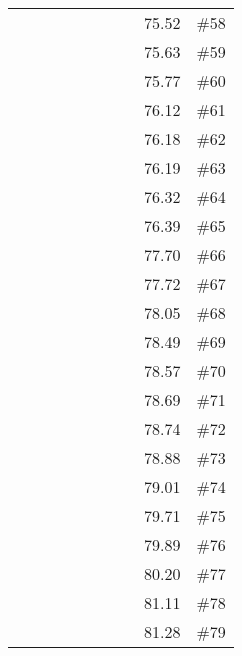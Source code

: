 \begin{longtable}{|c|c|c|c|c|c|c|c|c|c|}
 \x    & \x    & \x    &       &       &       &       & \x\m  & 75.52 & \#58 \\
 \x    & \x    & \x    &       &       & \x    &       &       & 75.63 & \#59 \\
 \x    & \x    & \x    &       & \x\m  &       &       &       & 75.77 & \#60 \\
 \x    & \x    & \x    & \x    &       & \x\m  &       & \x\m  & 76.12 & \#61 \\
 \x    & \x    & \x    & \x    &       &       & \x\m  &       & 76.18 & \#62 \\
 \x    & \x    & \x    & \x    & \x    & \x\m  &       & \x\m  & 76.19 & \#63 \\
 \x    & \x    & \x    &       &       &       &       &       & 76.32 & \#64 \\
 \x    & \x    & \x    &       & \x    &       & \x\m  &       & 76.39 & \#65 \\
 \x    & \x    & \x    & \x    & \x\m  &       & \x\m  &       & 77.70 & \#66 \\
 \x    & \x    & \x    &       & \x\m  & \x    & \x    &       & 77.72 & \#67 \\
 \x    & \x    & \x    & \x    & \x\m  &       & \x    &       & 78.05 & \#68 \\
 \x    & \x    & \x    & \x    &       & \x\m  &       & \x    & 78.49 & \#69 \\
 \x    & \x    &       & \x    & \x\m  & \x\m  &       & \x\m  & 78.57 & \#70 \\
 \x    & \x    & \x    & \x    & \x    &       &       & \x    & 78.69 & \#71 \\
 \x    & \x    & \x    &       & \x    & \x\m  &       & \x\m  & 78.74 & \#72 \\
 \x    & \x    & \x    &       & \x    & \x\m  &       &       & 78.88 & \#73 \\
 \x    & \x    &       & \x    & \x    & \x    &       &       & 79.01 & \#74 \\
 \x    & \x    &       &       & \x\m  & \x\m  & \x\m  &       & 79.71 & \#75 \\
 \x    & \x    & \x    & \x    &       &       & \x    &       & 79.89 & \#76 \\
 \x    & \x    & \x    &       &       & \x\m  &       & \x\m  & 80.20 & \#77 \\
 \x    & \x    & \x    & \x    & \x    & \x\m  &       & \x    & 81.11 & \#78 \\
 \x    & \x    &       &       &       &       &       &       & 81.28 & \#79 \\

\end{longtable}
